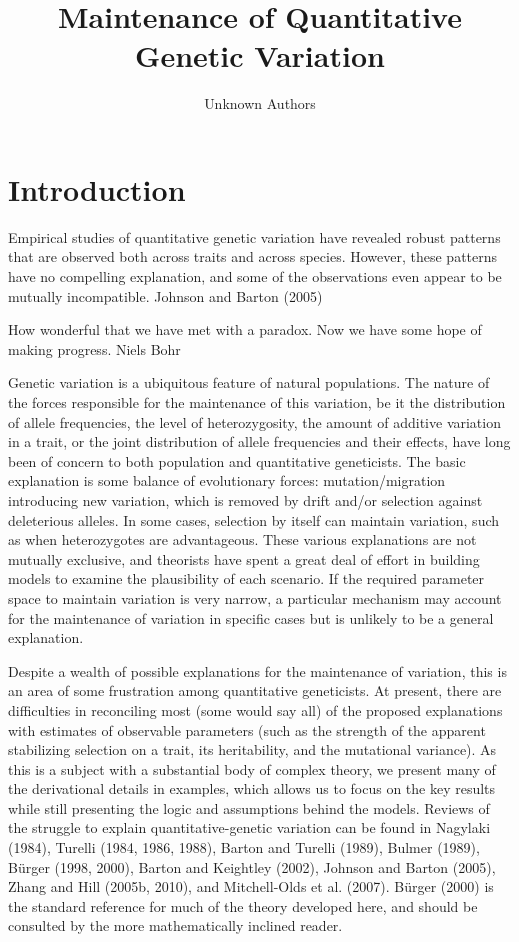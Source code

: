 \documentclass{article}
\title{Maintenance of Quantitative Genetic Variation}
\author{Unknown Authors}
\date{}
\begin{document}
\maketitle

\begin{abstract}

\end{abstract}

\section{Introduction}
Empirical studies of quantitative genetic variation have revealed robust patterns that are observed both across traits and across species. However, these patterns have no compelling explanation, and some of the observations even appear to be mutually incompatible. Johnson and Barton (2005)

How wonderful that we have met with a paradox. Now we have some hope of making progress.
Niels Bohr

Genetic variation is a ubiquitous feature of natural populations. The nature of the forces responsible for the maintenance of this variation, be it the distribution of allele frequencies, the level of heterozygosity, the amount of additive variation in a trait, or the joint distribution of allele frequencies and their effects, have long been of concern to both population and quantitative geneticists. The basic explanation is some balance of evolutionary forces: mutation/migration introducing new variation, which is removed by drift and/or selection against deleterious alleles. In some cases, selection by itself can maintain variation, such as when heterozygotes are advantageous. These various explanations are not mutually exclusive, and theorists have spent a great deal of effort in building models to examine the plausibility of each scenario. If the required parameter space to maintain variation is very narrow, a particular mechanism may account for the maintenance of variation in specific cases but is unlikely to be a general explanation.

Despite a wealth of possible explanations for the maintenance of variation, this is an area of some frustration among quantitative geneticists. At present, there are difficulties in reconciling most (some would say all) of the proposed explanations with estimates of observable parameters (such as the strength of the apparent stabilizing selection on a trait, its heritability, and the mutational variance). As this is a subject with a substantial body of complex theory, we present many of the derivational details in examples, which allows us to focus on the key results while still presenting the logic and assumptions behind the models. Reviews of the struggle to explain quantitative-genetic variation can be found in Nagylaki (1984), Turelli (1984, 1986, 1988), Barton and Turelli (1989), Bulmer (1989), Bürger (1998, 2000), Barton and Keightley (2002), Johnson and Barton (2005), Zhang and Hill (2005b, 2010), and Mitchell-Olds et al. (2007). Bürger (2000) is the standard reference for much of the theory developed here, and should be consulted by the more mathematically inclined reader.
\end{document}
